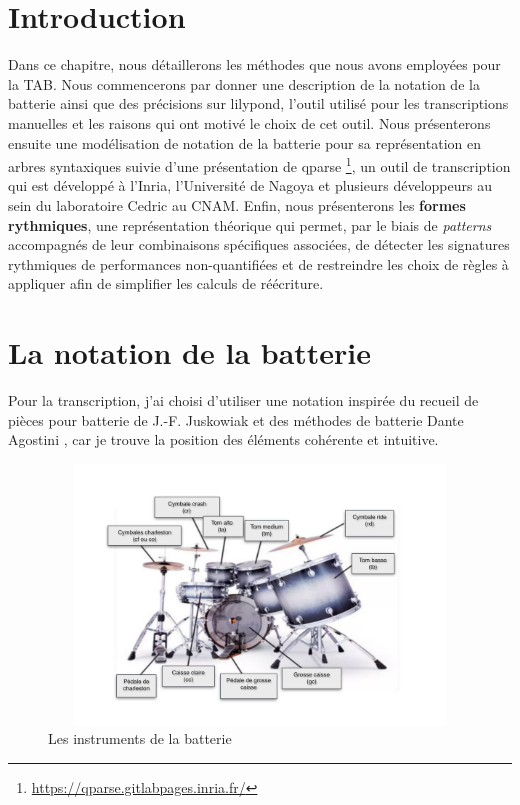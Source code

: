 \section*{Introduction}
Dans ce chapitre, nous détaillerons les méthodes que nous avons employées pour
la TAB. Nous commencerons par donner une description de la notation de la
batterie ainsi que des précisions sur lilypond, l’outil utilisé pour les
transcriptions manuelles et les raisons qui ont motivé le choix de cet outil.
Nous présenterons ensuite une modélisation de notation de la batterie pour sa
représentation en arbres syntaxiques suivie d’une présentation de qparse
\footnote{\url{https://qparse.gitlabpages.inria.fr/}}, un outil de transcription qui
est développé à l'Inria, l'Université de Nagoya et plusieurs développeurs au
sein du laboratoire Cedric au CNAM. Enfin, nous présenterons les
\textbf{formes rythmiques}, une représentation théorique qui
permet, par le biais de \textit{patterns} accompagnés de leur combinaisons
spécifiques associées, de détecter les signatures rythmiques de performances
non-quantifiées et de restreindre les choix de règles à appliquer afin de 
simplifier les calculs de réécriture.

\section{La notation de la batterie}
\label{notation_batterie}
Pour la transcription, j’ai choisi d’utiliser une notation inspirée du recueil
de pièces pour batterie de J.-F. Juskowiak \cite{jusko} et des méthodes de
batterie Dante Agostini \cite{ago_meth_3}, car je trouve la position des éléments
cohérente et intuitive.

\begin{figure}[h]
\centering
\includegraphics[height=69mm, width=115mm]{
z_images/3_methodes/0_notation_de_la_batterie/batterie.png}
\caption{Les instruments de la batterie}
\label{instru_batt}
\end{figure}

